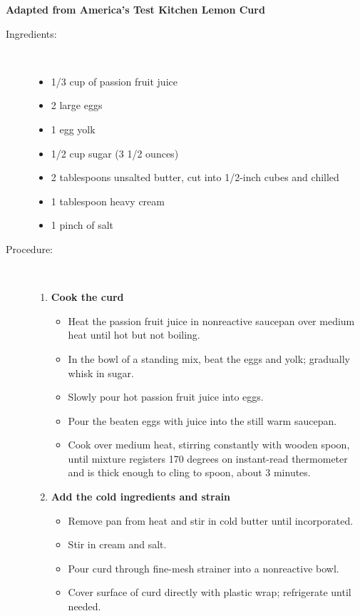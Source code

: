 \documentclass[11pt,letterpaper]{article}
\begin{document}


\begin{flushright}
{\bf Adapted from America's Test Kitchen Lemon Curd}
\end{flushright}

\begin{description}

\item[Ingredients:]\ \\
	\begin{itemize}
	\item 1/3 cup of passion fruit juice
	\item 2 large eggs
	\item 1 egg yolk
	\item 1/2 cup sugar (3 1/2 ounces)
	\item 2 tablespoons unsalted butter, cut into 1/2-inch cubes and chilled
	\item 1 tablespoon heavy cream
	\item 1 pinch of salt
	\end{itemize}

\item[Procedure:]\ \\
	\begin{enumerate}
	\item {\bf Cook the curd}
	\begin{itemize}
	\item Heat the passion fruit juice in nonreactive saucepan over medium heat until hot but not boiling. 	
	\item In the bowl of a standing mix, beat the eggs and yolk; gradually whisk in sugar. 
	\item Slowly pour hot passion fruit juice into eggs.
	\item Pour the beaten eggs with juice into the still warm saucepan.
	\item Cook over medium heat, stirring constantly with wooden spoon, until mixture registers 170 degrees on instant-read thermometer and is thick enough to cling to spoon, about 3 minutes.
	\end{itemize}
	\item {\bf Add the cold ingredients and strain}
	\begin{itemize}
	\item Remove pan from heat and stir in cold butter until incorporated.
	\item Stir in cream and salt.
	\item  Pour curd through fine-mesh strainer into a nonreactive bowl. 
	\item Cover surface of curd directly with plastic wrap; refrigerate until needed.
	\end{itemize}
	\end{enumerate}

\end{description}
\end{document}
